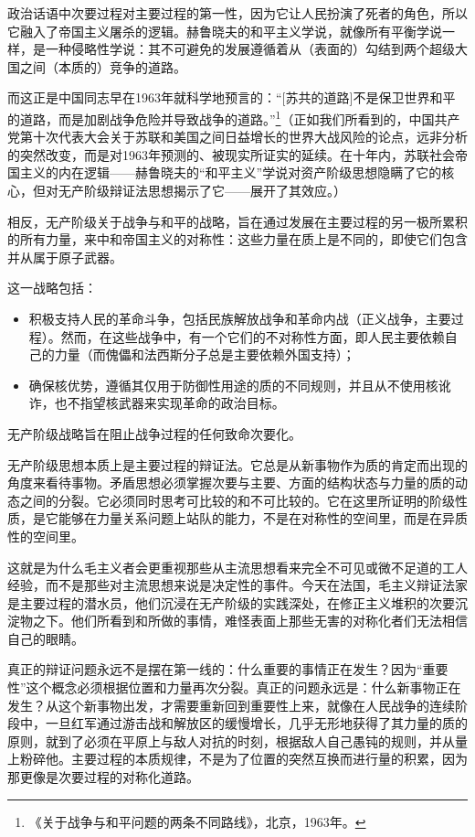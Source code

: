 \documentclass[fontset=fandol, a4paper, 12pt, twoside]{ctexart}
\begin{document}
政治话语中次要过程对主要过程的第一性，因为它让人民扮演了死者的角色，所以它融入了帝国主义屠杀的逻辑。赫鲁晓夫的和平主义学说，就像所有平衡学说一样，是一种侵略性学说：其不可避免的发展遵循着从（表面的）勾结到两个超级大国之间（本质的）竞争的道路。

而这正是中国同志早在1963年就科学地预言的：“[苏共的道路]不是保卫世界和平的道路，而是加剧战争危险并导致战争的道路。”\footnote{《关于战争与和平问题的两条不同路线》，北京，1963年。}（正如我们所看到的，中国共产党第十次代表大会关于苏联和美国之间日益增长的世界大战风险的论点，远非分析的突然改变，而是对1963年预测的、被现实所证实的延续。在十年内，苏联社会帝国主义的内在逻辑——赫鲁晓夫的“和平主义”学说对资产阶级思想隐瞒了它的核心，但对无产阶级辩证法思想揭示了它——展开了其效应。）

相反，无产阶级关于战争与和平的战略，旨在通过发展在主要过程的另一极所累积的所有力量，来中和帝国主义的对称性：这些力量在质上是不同的，即使它们包含并从属于原子武器。

这一战略包括：

\begin{itemize}
    \item 积极支持人民的革命斗争，包括民族解放战争和革命内战（正义战争，主要过程）。然而，在这些战争中，有一个它们的不对称性方面，即人民主要依赖自己的力量（而傀儡和法西斯分子总是主要依赖外国支持）；
    \item 确保核优势，遵循其仅用于防御性用途的质的不同规则，并且从不使用核讹诈，也不指望核武器来实现革命的政治目标。
\end{itemize}

无产阶级战略旨在阻止战争过程的任何致命次要化。

无产阶级思想本质上是主要过程的辩证法。它总是从新事物作为质的肯定而出现的角度来看待事物。矛盾思想必须掌握次要与主要、方面的结构状态与力量的质的动态之间的分裂。它必须同时思考可比较的和不可比较的。它在这里所证明的阶级性质，是它能够在力量关系问题上站队的能力，不是在对称性的空间里，而是在异质性的空间里。

这就是为什么毛主义者会更重视那些从主流思想看来完全不可见或微不足道的工人经验，而不是那些对主流思想来说是决定性的事件。今天在法国，毛主义辩证法家是主要过程的潜水员，他们沉浸在无产阶级的实践深处，在修正主义堆积的次要沉淀物之下。他们所看到和所做的事情，难怪表面上那些无害的对称化者们无法相信自己的眼睛。

真正的辩证问题永远不是摆在第一线的：什么重要的事情正在发生？因为“重要性”这个概念必须根据位置和力量再次分裂。真正的问题永远是：什么新事物正在发生？从这个新事物出发，才需要重新回到重要性上来，就像在人民战争的连续阶段中，一旦红军通过游击战和解放区的缓慢增长，几乎无形地获得了其力量的质的原则，就到了必须在平原上与敌人对抗的时刻，根据敌人自己愚钝的规则，并从量上粉碎他。主要过程的本质规律，不是为了位置的突然互换而进行量的积累，因为那更像是次要过程的对称化道路。
\end{document}
